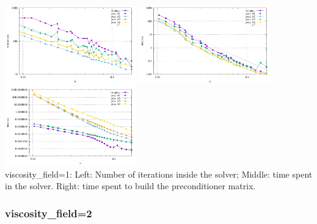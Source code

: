 \begin{center} 
\includegraphics[width=5.7cm]{python_codes/fieldstone_16/results/visc_field_1/niterations.pdf}
\includegraphics[width=5.7cm]{python_codes/fieldstone_16/results/visc_field_1/solve_time.pdf}
\includegraphics[width=5.7cm]{python_codes/fieldstone_16/results/visc_field_1/build_precond.pdf}\\
{\captionfont viscosity\_field=1: Left: Number of iterations inside the solver; 
Middle: time spent in the solver.
Right: time spent to build the preconditioner matrix.}
\end{center} 


\newpage
\subsubsection{viscosity\_field=2}

